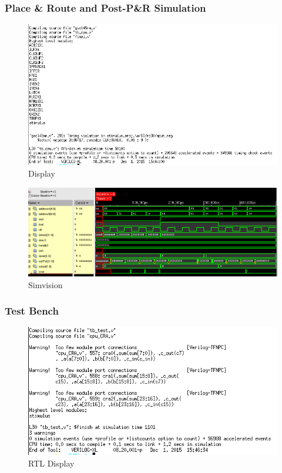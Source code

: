 \documentclass[12pt]{article}
\begin{document}
\subsubsection{Place \& Route and Post-P\&R Simulation}
\begin{figure}[H]
\centering
\includegraphics[width=.7\linewidth]{../CRA/encounter-text}
\caption{Display}
\label{fig:encounter-text}
\end{figure}
\begin{figure}[H]
\centering
\includegraphics[width=1\linewidth]{../CRA/encounter-test}
\caption{Simvision}
\label{fig:encounter-test}
\end{figure}

\subsubsection{Test Bench}
\begin{figure}[H]
\centering
\includegraphics[width=.7\linewidth]{../CRA/test-text}
\caption{RTL Display}
\label{fig:test-text}
\end{figure}
\end{document}
